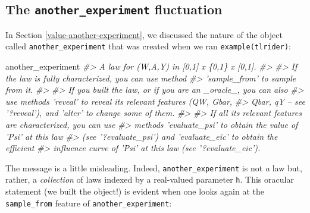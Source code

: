 \documentclass[11pt,openright,twoside]{book}
\newenvironment{Shaded}{\begin{snugshade}}{\end{snugshade}}
\newcommand{\CommentTok}[1]{\textcolor[rgb]{0.56,0.35,0.01}{\textit{#1}}}
\newcommand{\NormalTok}[1]{#1}
\theoremstyle{definition}
\theoremstyle{definition}
\theoremstyle{definition}
\theoremstyle{remark}
\begin{document}
\hypertarget{fluctuations}{%
\subsection{\texorpdfstring{The \texttt{another\_experiment} fluctuation}{The another\_experiment fluctuation}}\label{fluctuations}}

In Section \ref{value-another-experiment}, we discussed the nature of the
object called \texttt{another\_experiment} that was created when we ran
\texttt{example(tlrider)}:

\begin{Shaded}
\begin{Highlighting}[]
\NormalTok{another_experiment}
\CommentTok{#> A law for (W,A,Y) in [0,1] x \{0,1\} x [0,1].}
\CommentTok{#> }
\CommentTok{#> If the law is fully characterized, you can use method}
\CommentTok{#> 'sample_from' to sample from it.}
\CommentTok{#> }
\CommentTok{#> If you built the law, or if you are an _oracle_, you can also}
\CommentTok{#> use methods 'reveal' to reveal its relevant features (QW, Gbar,}
\CommentTok{#> Qbar, qY -- see '?reveal'), and 'alter' to change some of them.}
\CommentTok{#> }
\CommentTok{#> If all its relevant features are characterized, you can use}
\CommentTok{#> methods 'evaluate_psi' to obtain the value of 'Psi' at this law}
\CommentTok{#> (see '?evaluate_psi') and 'evaluate_eic' to obtain the efficient}
\CommentTok{#> influence curve of 'Psi' at this law (see '?evaluate_eic').}
\end{Highlighting}
\end{Shaded}

The message is a little misleading. Indeed, \texttt{another\_experiment} is not \emph{a}
law but, rather, a \emph{collection} of laws indexed by a real-valued parameter
\texttt{h}. This oracular statement (we built the object!) is evident when one looks
again at the \texttt{sample\_from} feature of \texttt{another\_experiment}:
\end{document}

